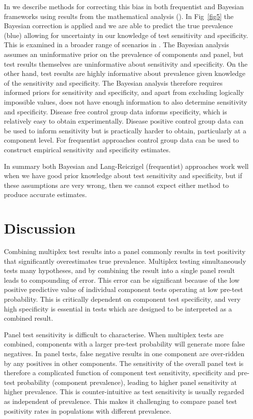\documentclass[10pt,letterpaper]{article}
\begin{document}
In  we describe methods for correcting this bias in both frequentist and Bayesian frameworks using results from the mathematical analysis (). In Fig~\ref{fig5} the Bayesian correction is applied and we are able to predict the true prevalence (blue) allowing for uncertainty in our knowledge of test sensitivity and specificity. This is examined in a broader range of scenarios in . The Bayesian analysis assumes an uninformative prior on the prevalence of components and panel, but test results themselves are uninformative about sensitivity and specificity. On the other hand, test results are highly informative about prevalence given knowledge of the sensitivity and specificity. The Bayesian analysis therefore requires informed priors for sensitivity and specificity, and apart from excluding logically impossible values, does not have enough information to also determine sensitivity and specificity. Disease free control group data informs specificity, which is relatively easy to obtain experimentally. Disease positive control group data can be used to inform sensitivity but is practically harder to obtain, particularly at a component level. For frequentist approaches control group data can be used to construct empirical sensitivity and specificity estimates.

In summary both Bayesian and Lang-Reiczigel (frequentist) approaches work well when we have good prior knowledge about test sensitivity and specificity, but if these assumptions are very wrong, then we cannot expect either method to produce accurate estimates.

\section*{Discussion}

Combining multiplex test results into a panel commonly results in test positivity that significantly overestimates true prevalence. Multiplex testing simultaneously tests many hypotheses, and by combining the result into a single panel result leads to compounding of error. This error can be significant because of the low positive predictive value of individual component tests operating at low pre-test probability. This is critically dependent on component test specificity, and very high specificity is essential in tests which are designed to be interpreted as a combined result.

Panel test sensitivity is difficult to characterise. When multiplex tests are combined, components with a larger pre-test probability will generate more false negatives. In panel tests, false negative results in one component are over-ridden by any positives in other components. The sensitivity of the overall panel test is therefore a complicated function of component test sensitivity, specificity and pre-test probability (component prevalence), leading to higher panel sensitivity at higher prevalence. This is counter-intuitive as test sensitivity is usually regarded as independent of prevalence. This makes it challenging to compare panel test positivity rates in populations with different prevalence.
\end{document}
